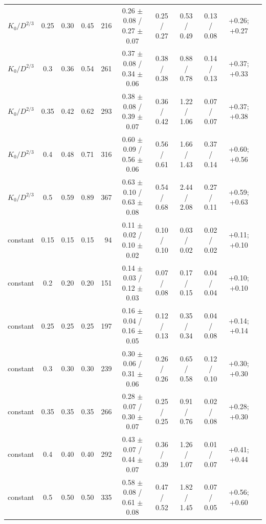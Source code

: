 \documentclass[11pt]{article}
\begin{document}
\begin{table}[H]
{\begin{tabular}{lcccrcccccc}
$K_0/D^{2/3}$ & 0.25 & 0.30 & 0.45 & 216 & 0.26 $\pm$ 0.08 / 0.27 $\pm$ 0.07 & 0.25 / 0.27 & 0.53 / 0.49 & 0.13 / 0.08 & +0.26; +0.27 \\
$K_0/D^{2/3}$ & 0.3 & 0.36 & 0.54 & 261 & 0.37 $\pm$ 0.08 / 0.34 $\pm$ 0.06 & 0.38 / 0.38 & 0.88 / 0.78 & 0.14 / 0.13 & +0.37; +0.33 \\
$K_0/D^{2/3}$ & 0.35 & 0.42 & 0.62 & 293 & 0.38 $\pm$ 0.08 / 0.39 $\pm$ 0.07 & 0.36 / 0.42 & 1.22 / 1.06 & 0.07 / 0.07 & +0.37; +0.38 \\
$K_0/D^{2/3}$ & 0.4 & 0.48 & 0.71 & 316 & 0.60 $\pm$ 0.09 / 0.56 $\pm$ 0.06 & 0.56 / 0.61 & 1.66 / 1.43 & 0.37 / 0.14 & +0.60; +0.56 \\
$K_0/D^{2/3}$ & 0.5 & 0.59 & 0.89 & 367 & 0.63 $\pm$ 0.10 / 0.63 $\pm$ 0.08 & 0.54 / 0.68 & 2.44 / 2.08 & 0.27 / 0.11 & +0.59; +0.63 \\
\midrule
constant & 0.15 & 0.15 & 0.15 & 94 & 0.11 $\pm$ 0.02 / 0.10 $\pm$ 0.02 & 0.10 / 0.10 & 0.03 / 0.02 & 0.02 / 0.02 & +0.11; +0.10 \\
constant & 0.2 & 0.20 & 0.20 & 151 & 0.14 $\pm$ 0.03 / 0.12 $\pm$ 0.03 & 0.07 / 0.08 & 0.17 / 0.15 & 0.04 / 0.04 & +0.10; +0.10 \\
constant & 0.25 & 0.25 & 0.25 & 197 & 0.16 $\pm$ 0.04 / 0.16 $\pm$ 0.05 & 0.12 / 0.13 & 0.35 / 0.34 & 0.04 / 0.08 & +0.14; +0.14 \\
constant & 0.3 & 0.30 & 0.30 & 239 & 0.30 $\pm$ 0.06 / 0.31 $\pm$ 0.06 & 0.26 / 0.26 & 0.65 / 0.58 & 0.12 / 0.10 & +0.30; +0.30 \\
constant & 0.35 & 0.35 & 0.35 & 266 & 0.28 $\pm$ 0.07 / 0.30 $\pm$ 0.07 & 0.25 / 0.25 & 0.91 / 0.76 & 0.02 / 0.08 & +0.28; +0.30 \\
constant & 0.4 & 0.40 & 0.40 & 292 & 0.43 $\pm$ 0.07 / 0.44 $\pm$ 0.07 & 0.36 / 0.39 & 1.26 / 1.07 & 0.01 / 0.07 & +0.41; +0.44 \\
constant & 0.5 & 0.50 & 0.50 & 335 & 0.58 $\pm$ 0.08 / 0.61 $\pm$ 0.08 & 0.47 / 0.52 & 1.82 / 1.45 & 0.07 / 0.05 & +0.56; +0.60 \\
\bottomrule
\end{tabular}}
\end{table}
\end{document}
